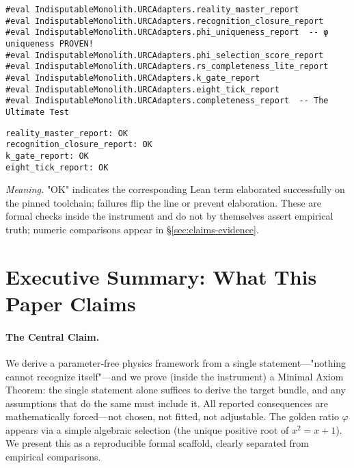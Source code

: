 \documentclass[11pt,a4paper,twoside]{article}
\numberwithin{equation}{section}
\theoremstyle{customthm}
\theoremstyle{customdef}
\theoremstyle{customrem}
\begin{document}
\hypertarget{verify-minimal}{}
\begin{importantbox}
\begin{lstlisting}
#eval IndisputableMonolith.URCAdapters.reality_master_report
#eval IndisputableMonolith.URCAdapters.recognition_closure_report
#eval IndisputableMonolith.URCAdapters.phi_uniqueness_report  -- φ uniqueness PROVEN!
#eval IndisputableMonolith.URCAdapters.phi_selection_score_report
#eval IndisputableMonolith.URCAdapters.rs_completeness_lite_report
#eval IndisputableMonolith.URCAdapters.k_gate_report
#eval IndisputableMonolith.URCAdapters.eight_tick_report
#eval IndisputableMonolith.URCAdapters.completeness_report  -- The Ultimate Test
\end{lstlisting}
\end{importantbox}

\begin{resultbox}
\small
\begin{verbatim}
reality_master_report: OK
recognition_closure_report: OK
k_gate_report: OK
eight_tick_report: OK
\end{verbatim}
\end{resultbox}

\noindent\emph{Meaning.} "OK" indicates the corresponding Lean term elaborated successfully on the pinned toolchain; failures flip the line or prevent elaboration. These are formal checks inside the instrument and do not by themselves assert empirical truth; numeric comparisons appear in \S\ref{sec:claims-evidence}.

\section*{Executive Summary: What This Paper Claims}\label{sec:executive}

\paragraph{The Central Claim.} We derive a parameter‑free physics framework from a single statement—"nothing cannot recognize itself"—and we prove (inside the instrument) a Minimal Axiom Theorem: the single statement alone suffices to derive the target bundle, and any assumptions that do the same must include it. All reported consequences are mathematically forced—not chosen, not fitted, not adjustable. The golden ratio $\varphi$ appears via a simple algebraic selection (the unique positive root of $x^2=x+1$). We present this as a reproducible formal scaffold, clearly separated from empirical comparisons.
\end{document}
